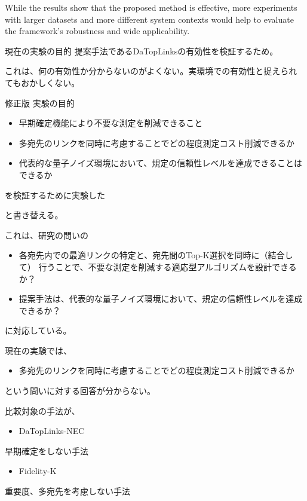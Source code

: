 \documentclass[conference,15pt]{IEEEtran}
\begin{document}
While the results show that the proposed method is effective, more
experiments with larger datasets and more different system contexts
would help to evaluate the framework's robustness and wide applicability.

現在の実験の目的
提案手法であるDaTopLinksの有効性を検証するため。

これは、何の有効性か分からないのがよくない。実環境での有効性と捉えられ
てもおかしくない。

修正版 実験の目的

\begin{itemize}
\item 早期確定機能により不要な測定を削減できること

\item 多宛先のリンクを同時に考慮することでどの程度測定コスト削減できるか

\item 代表的な量子ノイズ環境において、規定の信頼性レベルを達成できることは
できるか
\end{itemize}

を検証するために実験した

と書き替える。

これは、研究の問いの

\begin{itemize}
\item 各宛先内での最適リンクの特定と、宛先間のTop-K選択を同時に（結合して）
行うことで、不要な測定を削減する適応型アルゴリズムを設計できるか？

\item 提案手法は、代表的な量子ノイズ環境において、規定の信頼性レベルを達成できるか？
\end{itemize}

に対応している。

現在の実験では、
\begin{itemize}
\item 多宛先のリンクを同時に考慮することでどの程度測定コスト削減できるか
\end{itemize}
という問いに対する回答が分からない。

比較対象の手法が、

\begin{itemize}
\item DaTopLinks-NEC
\end{itemize}
早期確定をしない手法

\begin{itemize}
\item Fidelity-K
\end{itemize}
重要度、多宛先を考慮しない手法
\end{document}
